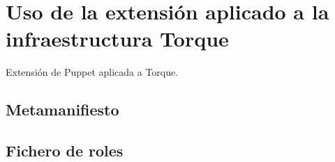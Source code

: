 \chapter{Uso de la extensión aplicado a la infraestructura Torque}
\label{cap:torque}

Extensión de Puppet aplicada a Torque.


\section{Metamanifiesto}
\section{Fichero de roles}
